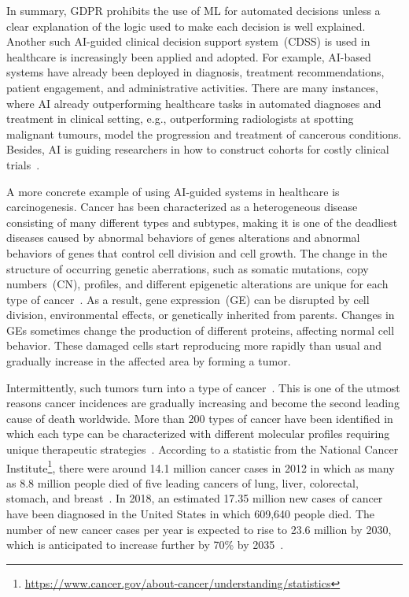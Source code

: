 \hspace*{3.5mm} In summary, GDPR prohibits the use of ML for automated decisions unless a clear explanation of the logic used to make each decision is well explained. Another such AI-guided clinical decision support system~(CDSS) is used in healthcare is increasingly been applied and adopted. For example, AI-based systems have already been deployed in diagnosis, treatment recommendations, patient engagement, and administrative activities. There are many instances, where AI already outperforming healthcare tasks in automated diagnoses and treatment in clinical setting, e.g., outperforming radiologists at spotting malignant tumours, model the progression and treatment of cancerous conditions. Besides, AI is guiding researchers in how to construct cohorts for costly clinical trials~\cite{davenport2019potential}. 

\hspace*{3.5mm} A more concrete example of using AI-guided systems in healthcare is carcinogenesis. Cancer has been characterized as a heterogeneous disease consisting of many different types and subtypes, making it is one of the deadliest diseases caused by abnormal behaviors of genes alterations and abnormal behaviors of genes that control cell division and cell growth. The change in the structure of occurring genetic aberrations, such as somatic mutations, copy numbers~(CN), profiles, and different epigenetic alterations are unique for each type of cancer~\cite{82Tomczak,13cancerdef,19Cruz}. As a result, gene expression~(GE) can be disrupted by cell division, environmental effects, or genetically inherited from parents. Changes in GEs sometimes change the production of different proteins, affecting normal cell behavior. These damaged cells start reproducing more rapidly than usual and gradually increase in the affected area by forming a tumor. 

\hspace*{3.5mm} Intermittently, such tumors turn into a type of cancer~\cite{zuo2019identification,24Podolsky}. This is one of the utmost reasons cancer incidences are gradually increasing and become the second leading cause of death worldwide. More than 200 types of cancer have been identified in which each type can be characterized with different molecular profiles requiring unique therapeutic strategies~\cite{82Tomczak}. According to a statistic from the National Cancer Institute\footnote{\url{https://www.cancer.gov/about-cancer/understanding/statistics}}, there were around 14.1 million cancer cases in 2012 in which as many as 8.8 million people died of five leading cancers of lung, liver, colorectal, stomach, and breast~\cite{stat}. In 2018, an estimated 17.35 million new cases of cancer have been diagnosed in the United States in which 609,640 people died. The number of new cancer cases per year is expected to rise to 23.6 million by 2030, which is anticipated to increase further by 70\% by 2035~\cite{71Torre}. 

